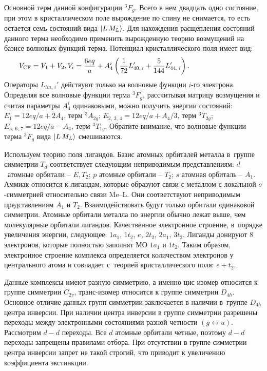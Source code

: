  Основной терм данной конфигурации $^3F_g$. Всего в нем двадцать одно состояние, при этом в кристаллическом поле вырождение по спину не снимается, то есть остается семь состояний вида $\ket{L\,M_L}$. Для нахождения расщепления состояний данного терма необходимо применить вырожденную теорию возмущений на базисе волновых функций терма. Потенциал кристаллического поля имеет вид:
\begin{equation*}
\begin{aligned}
& V_{\text{CF}}= V_{1}+V_{2}, V_i = \dfrac{6eq}{a} + A_{4}^i \left( \dfrac{1}{72}L_{40,\,i}' +\dfrac{5}{144}L_{44,\,i}'  \right). \hspace{25mm}
\end{aligned}
\end{equation*}
Операторы $L_{lm,\,i}'$ действуют только на волновые функции $i$-го электрона. Определяя все волновые функции терма $^3F_g$, рассчитывая матрицу возмущения и считая параметры $A_{4}^i$ одинаковыми, можно получить энергии состояний: $E_{1}=12eq/a+2A_4$, терм $^3A_{2g}$; $E_{2,\,3,\,4}=12eq/a+A_4/3$, терм $^3T_{2g}$; $E_{5,\,6,\,7}=12eq/a-A_4$, терм $^3T_{1g}$. Обратите внимание, что волновые функции терма $^3F_g$ вида $\ket{L\,M_L}$ смешиваются.\par
{} Используем теорию поля лигандов. Базис атомных орбиталей металла в~группе симметрии $T_d$ соответствует следующим неприводимым представлениям: $d$~атомные орбитали – $E\text{,}\,T_2$; $p$ атомные орбитали – $T_2$; $s$ атомная орбиталь – $A_1$. Аммиак относится к лигандам, которые образуют связи с металлом с локальной $\sigma$-симметрией относительно связи Me–L. Они соответствуют неприводимым представлениям $A_1$ и $T_2$. Взаимодействовать будут только орбитали одинаковой симметрии. Атомные орбитали металла по энергии обычно лежат выше, чем молекулярные орбитали лигандов. Качественное электронное строение, в~порядке увеличения энергии, следующее: $1a_1$, $1t_2$, $e$, $2t_2$, $2a_1$, $3t_2$. Лиганды донируют 8 электронов, которые полностью заполнят МО $1a_1$ и $1t_2$. Таким образом, электронное строение комплекса определяется количеством электронов у центрального атома и совпадает с~теорией кристаллического поля: $e+t_2$.\par
{} Данные комплексы имеют разную симметрию, а именно цис-изомер относится к группе симметрии $C_{2v}$, транс-изомер относится к группе симметрии $D_{4h}$. Основное отличие данных групп симметрии заключается в наличии в~группе $D_{4h}$ центра инверсии. При наличии центра инверсии в группе симметрии разрешены переходы между электронными состояниями разной четности $(g \leftrightarrow u)$. Рассмотрим $d-d$ переходы. Все $d$ атомные орбитали четные, поэтому $d-d$ переходы запрещены правилами отбора. При отсутствии в группе симметрии центра инверсии запрет не такой строгий, что приводит к увеличению коэффициента экстинкции.\par
